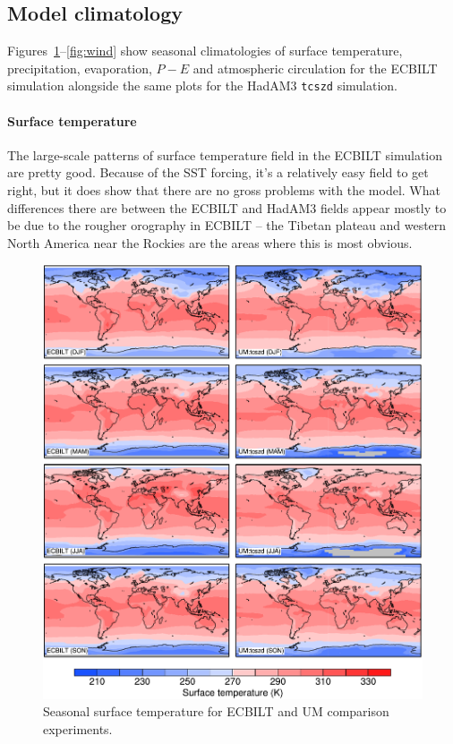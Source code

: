 \documentclass[a4paper,11pt,article]{article}
\begin{document}
\subsection{Model climatology}

Figures~\ref{fig:ts}--\ref{fig:wind} show seasonal climatologies of
surface temperature, precipitation, evaporation, $P-E$ and atmospheric
circulation for the ECBILT simulation alongside the same plots for the
HadAM3 \texttt{tcszd} simulation.

\paragraph{Surface temperature}

The large-scale patterns of surface temperature field in the ECBILT
simulation are pretty good.  Because of the SST forcing, it's a
relatively easy field to get right, but it does show that there are no
gross problems with the model.  What differences there are between the
ECBILT and HadAM3 fields appear mostly to be due to the rougher
orography in ECBILT -- the Tibetan plateau and western North America
near the Rockies are the areas where this is most obvious.

\begin{figure}
  \begin{center}
    \includegraphics[width=\textwidth]{control-expt-1/ts-plots}
  \end{center}
  \caption{Seasonal surface temperature for ECBILT and UM comparison
    experiments.}
  \label{fig:ts}
\end{figure}
\end{document}
